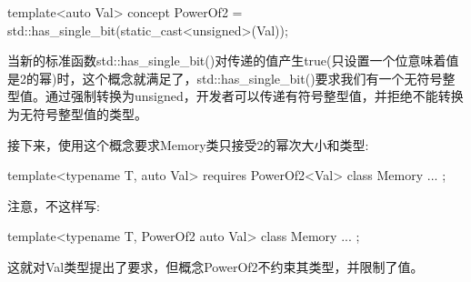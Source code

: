 \begin{cpp}
template<auto Val>
concept PowerOf2 = std::has_single_bit(static_cast<unsigned>(Val));
\end{cpp}

当新的标准函数std::has\_single\_bit()对传递的值产生true(只设置一个位意味着值是2的幂)时，这个概念就满足了，std::has\_single\_bit()要求我们有一个无符号整型值。通过强制转换为unsigned，开发者可以传递有符号整型值，并拒绝不能转换为无符号整型值的类型。

接下来，使用这个概念要求Memory类只接受2的幂次大小和类型:

\begin{cpp}
template<typename T, auto Val>
requires PowerOf2<Val>
class Memory {
	...
};
\end{cpp}

注意，不这样写:

\begin{cpp}
template<typename T, PowerOf2 auto Val>
class Memory {
	...
};
\end{cpp}

这就对Val类型提出了要求，但概念PowerOf2不约束其类型，并限制了值。








